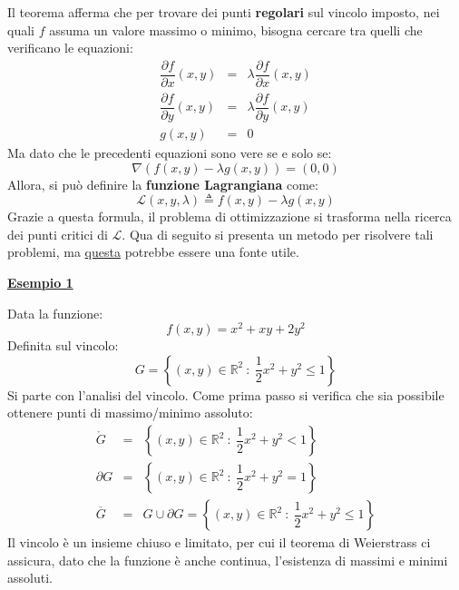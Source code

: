 \documentclass[a4paper]{article}
\newcommand{\definition}[1]{\textcolor{Red3}{\textbf{#1}}}
\newcommand{\example}[1]{\textcolor{Green4}{\textbf{#1}}}
\begin{document}
	\noindent
	Il teorema afferma che per trovare dei punti \textbf{regolari} sul vincolo imposto, nei quali $f$ assuma un valore massimo o minimo, bisogna cercare tra quelli che verificano le equazioni:
	\begin{equation*}
		\begin{array}{rcl}
			\dfrac{\partial f}{\partial x}\left(x,y\right) &=& \lambda \dfrac{\partial f}{\partial x}\left(x,y\right) \\ [1em]
			\dfrac{\partial f}{\partial y}\left(x,y\right) &=& \lambda \dfrac{\partial f}{\partial y}\left(x,y\right) \\ [1em]
			g\left(x,y\right) &=& 0
		\end{array}
	\end{equation*}
	Ma dato che le precedenti equazioni sono vere se e solo se:
	\begin{equation*}
		\nabla \left(f\left(x,y\right) - \lambda g\left(x,y\right)\right) = \left(0,0\right)
	\end{equation*}
	Allora, si può definire la \definition{funzione Lagrangiana} come:
	\begin{equation}\label{eq: funzione Lagrangiana}
		\mathcal{L}\left(x,y,\lambda\right) \triangleq f\left(x,y\right) - \lambda g\left(x,y\right)
	\end{equation}
	Grazie a questa formula, il problema di ottimizzazione si trasforma nella ricerca dei punti critici di $\mathcal{L}$. Qua di seguito si presenta un metodo per risolvere tali problemi, ma \href{https://www.youmath.it/lezioni/analisi-due/varie/822-massimi-e-minimi-vincolati-in-2-variabili.html}{questa} potrebbe essere una fonte utile.\newpage

	\begin{flushleft}
		\example{\underline{Esempio 1}}
	\end{flushleft}
	Data la funzione:
	\begin{equation*}
		f\left(x,y\right) = x^{2} + xy + 2y^{2}
	\end{equation*}
	Definita sul vincolo:
	\begin{equation*}
		G = \left\{\left(x,y\right) \in \mathbb{R}^{2} \: : \: \dfrac{1}{2}x^{2} + y^{2} \le 1\right\}
	\end{equation*}
	Si parte con l'analisi del vincolo. Come prima passo si verifica che sia possibile ottenere punti di massimo/minimo assoluto:
	\begin{equation*}
		\begin{array}{rcl}
			\mathring{G} &=& \left\{\left(x,y\right) \in \mathbb{R}^{2} \: : \: \dfrac{1}{2}x^{2} + y^{2} < 1\right\} \\ [.5em]
			\partial G &=& \left\{\left(x,y\right) \in \mathbb{R}^{2} \: : \: \dfrac{1}{2}x^{2} + y^{2} = 1\right\} \\ [.5em]
			\overline{G} &=& G \cup \partial G = \left\{\left(x,y\right) \in \mathbb{R}^{2} \: : \: \dfrac{1}{2}x^{2} + y^{2} \le 1\right\}
		\end{array}
	\end{equation*}
	Il vincolo è un insieme chiuso e limitato, per cui il teorema di Weierstrass ci assicura, dato che la funzione è anche continua, l'esistenza di massimi e minimi assoluti.\newline
\end{document}
